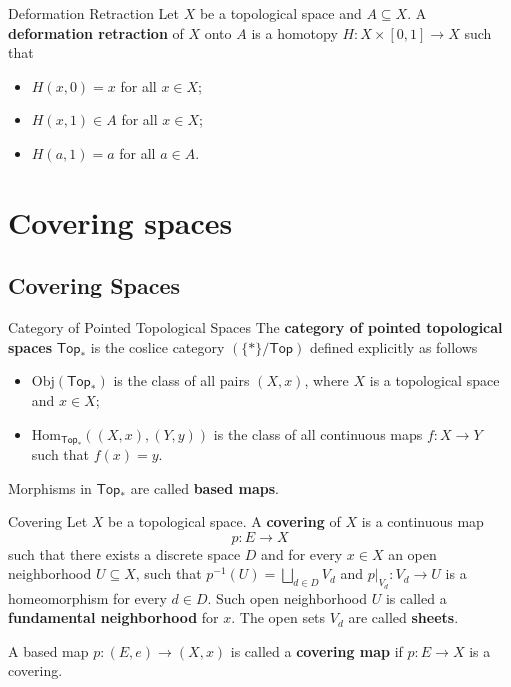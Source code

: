 \documentclass{report}
\newcommand{\Top}{\mathsf{Top}}
\newcommand{\Obj}{\mathrm{Obj}}
\newcommand{\Hom}{\mathrm{Hom}}
\begin{document}
\begin{definition}{Deformation Retraction}{}
	Let $X$ be a topological space and $A\subseteq X$. A \textbf{deformation retraction} of $X$ onto $A$ is a homotopy $H:X\times [0,1]\to X$ such that
	\begin{itemize}
		\item $H(x,0)=x$ for all $x\in X$;
		\item $H(x,1)\in A$ for all $x\in X$;
		\item $H(a,1)=a$ for all $a\in A$.
	\end{itemize}
\end{definition}



\chapter{Covering spaces}
\section{Covering Spaces}

\begin{definition}{Category of Pointed Topological Spaces}{}
	The \textbf{category of pointed topological spaces} $\Top_*$ is the coslice category $\left(\{*\}/\Top\right)$ defined explicitly as follows
	\begin{itemize}
		\item $\Obj(\Top_*)$ is the class of all pairs $(X,x)$, where $X$ is a topological space and $x\in X$;
		\item $\Hom_{\Top_*}((X,x),(Y,y))$ is the class of all continuous maps $f:X\to Y$ such that $f(x)=y$. 
	\end{itemize}
	Morphisms in $\Top_*$ are called \textbf{based maps}.
\end{definition}

\begin{definition}{Covering}{}
	Let $X$ be a topological space. A \textbf{covering} of $X$ is a continuous map
$$
p: E \longrightarrow X
$$
such that there exists a discrete space $D$ and for every $x \in X$ an open neighborhood $U \subseteq X$, such that $p^{-1}(U)=\bigsqcup_{d \in D} V_d$ and $\left.p\right|_{V_d}: V_d \rightarrow U$ is a homeomorphism for every $d \in D$. Such open neighborhood $U$ is called a \textbf{fundamental neighborhood} for $x$. The open sets $V_d$ are called \textbf{sheets}.
\end{definition}

A based map $p:(E,e)\to (X,x)$ is called a \textbf{covering map} if $p:E\to X$ is a covering. 
\end{document}
